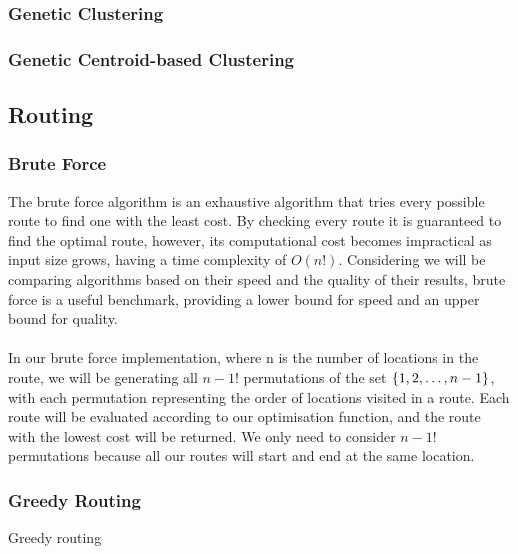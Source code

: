 
\subsubsection{Genetic Clustering}
\subsubsection{Genetic Centroid-based Clustering}

\subsection{Routing}\label{subsec:routing}
\subsubsection{Brute Force}\label{subsubsec:brute-force-routing}
The brute force algorithm is an exhaustive algorithm that tries every possible route to find one with the least cost.
By checking every route it is guaranteed to find the optimal route, however, its computational cost becomes
impractical as input size grows, having a time complexity of $O(n!)$.
Considering we will be comparing algorithms based on their speed and the quality of their results, brute force is a
useful benchmark, providing a lower bound for speed and an upper bound for quality.\\
\\
In our brute force implementation, where n is the number of locations in the route, we will be generating all $n-1!$
permutations of the set $\{1, 2, \mathellipsis, n-1\}$, with each permutation representing the order of locations
visited in a route.
Each route will be evaluated according to our optimisation function, and the route with the lowest cost will be
returned.
We only need to consider $n-1!$ permutations because all our routes will start and end at the same location.\\


\subsubsection{Greedy Routing}\label{subsubsec:greedy-routing}
Greedy routing
